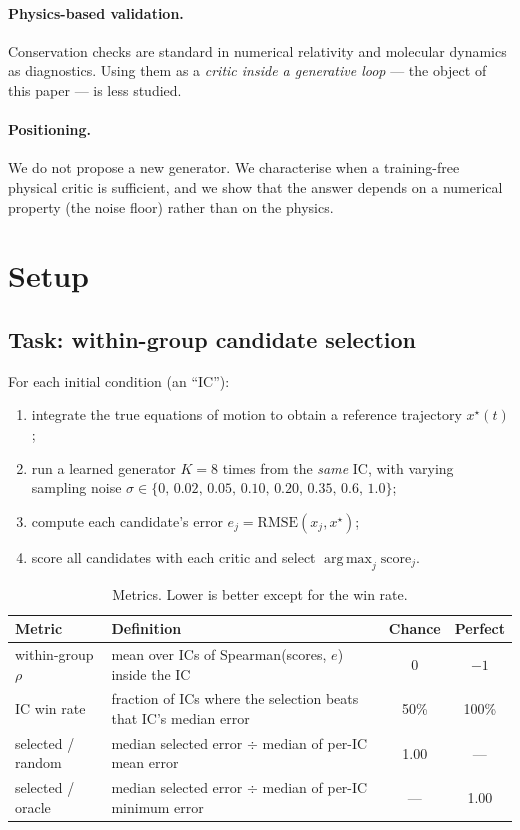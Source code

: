 \documentclass[11pt]{article}
\newcommand{\argmax}{\operatorname*{arg\,max}}
\newcommand{\rmse}{\mathrm{RMSE}}
\begin{document}
\paragraph{Physics-based validation.} Conservation checks are standard in numerical
relativity and molecular dynamics as diagnostics. Using them as a \emph{critic inside a
generative loop} --- the object of this paper --- is less studied.

\paragraph{Positioning.} We do not propose a new generator. We characterise when a
training-free physical critic is sufficient, and we show that the answer depends on a
numerical property (the noise floor) rather than on the physics.

\section{Setup}
\label{sec:setup}

\subsection{Task: within-group candidate selection}

For each initial condition (an ``IC''):

\begin{enumerate}
  \item integrate the true equations of motion to obtain a reference trajectory
    $x^{\star}(t)$;
  \item run a learned generator $K=8$ times from the \emph{same} IC, with varying
    sampling noise $\sigma\in\{0,\,0.02,\,0.05,\,0.10,\,0.20,\,0.35,\,0.6,\,1.0\}$;
  \item compute each candidate's error $e_j = \rmse(x_j, x^{\star})$;
  \item score all candidates with each critic and select $\argmax_j \mathrm{score}_j$.
\end{enumerate}

\begin{table}[t]
\centering
\small
\caption{Metrics. Lower is better except for the win rate.}
\label{tab:metrics}
\begin{tabular}{llcc}
\toprule
Metric & Definition & Chance & Perfect \\
\midrule
within-group $\rho$ & mean over ICs of Spearman(scores, $e$) inside the IC & $0$ & $-1$ \\
IC win rate & fraction of ICs where the selection beats that IC's median error & 50\% & 100\% \\
selected / random & median selected error $\div$ median of per-IC mean error & 1.00 & --- \\
selected / oracle & median selected error $\div$ median of per-IC minimum error & --- & 1.00 \\
\bottomrule
\end{tabular}
\end{table}
\end{document}
